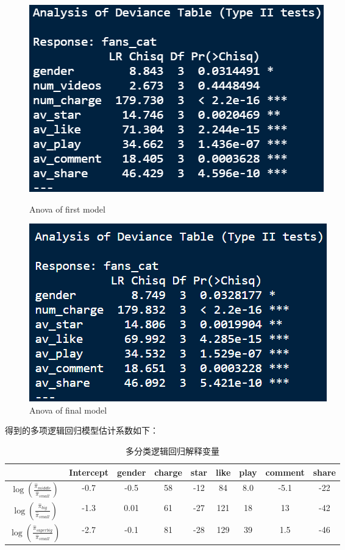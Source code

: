 \documentclass{ctexart}
\begin{document}
\begin{figure}[H]
    \centering
    \begin{minipage}[t]{0.48\textwidth}
        \centering
        \includegraphics[width=\textwidth]{MLR/AnovaMul1.png}
        \caption{Anova of first model}
    \end{minipage}
    \begin{minipage}[t]{0.48\textwidth}
        \centering
        \includegraphics[width=\textwidth]{MLR/AnovaMul2.png}
        \caption{Anova of final model}
    \end{minipage}
\end{figure}

得到的多项逻辑回归模型估计系数如下：

\begin{table}[H]
    \centering
    \begin{tabular}{ccccccccc}
        \toprule
          & Intercept & gender & charge & star
          & like & play & comment & share\\
        \midrule
          $\log(\frac{\hat\pi_{middle}}{\hat\pi_{small}})$ 
          & -0.7 & -0.5 & 58 & -12
          & 84 & 8.0 & -5.1 & -22\\
          $\log(\frac{\hat\pi_{big}}{\hat\pi_{small}})$
          & -1.3 & 0.01 & 61 & -27
          & 121 & 18 & 13 & -42\\
          $\log(\frac{\hat\pi_{super big}}{\hat\pi_{small}})$
          & -2.7 & -0.1 & 81 & -28
          & 129 & 39 & 1.5 & -46\\
        \bottomrule
     \end{tabular}
    \caption{多分类逻辑回归解释变量}
\end{table}
\end{document}

